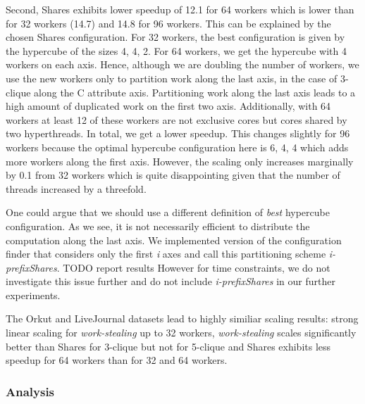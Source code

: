 Second, Shares exhibits lower speedup of 12.1 for 64 workers which is
lower than for 32 workers (14.7) and 14.8 for 96 workers.
This can be explained by the chosen Shares configuration.
For 32 workers, the best configuration is given by the hypercube of the sizes 4, 4, 2.
For 64 workers, we get the hypercube with 4 workers on each axis.
Hence, although we are doubling the number of workers, we use the new workers only to partition
work along the last axis, in the case of 3-clique along the C attribute axis.
Partitioning work along the last axis leads to a high amount of duplicated work on the first
two axis.
Additionally, with 64 workers at least 12 of these workers are not exclusive cores but cores shared by
two hyperthreads.
In total, we get a lower speedup.
This changes slightly for 96 workers because the optimal hypercube configuration here is 6, 4, 4 which
adds more workers along the first axis.
However, the scaling only increases marginally by 0.1 from 32 workers which is quite disappointing given
that the number of threads increased by a threefold.

One could argue that we should use a different definition of \textit{best} hypercube configuration.
As we see, it is not necessarily efficient to distribute the computation along the last axis.
We implemented version of the configuration finder that considers only the first \textit{i} axes and
call this partitioning scheme \textit{i-prefixShares}.
TODO report results
However for time constraints, we do not investigate this issue further and do not include \textit{i-prefixShares}
in our further experiments.

The Orkut and LiveJournal datasets lead to highly similiar scaling results:
strong linear scaling for \textit{work-stealing} up to 32 workers,
\textit{work-stealing} scales significantly better than Shares for 3-clique but
not for 5-clique and Shares exhibits less speedup for 64 workers than for 32 and 64 workers.










\subsubsection{Analysis}





